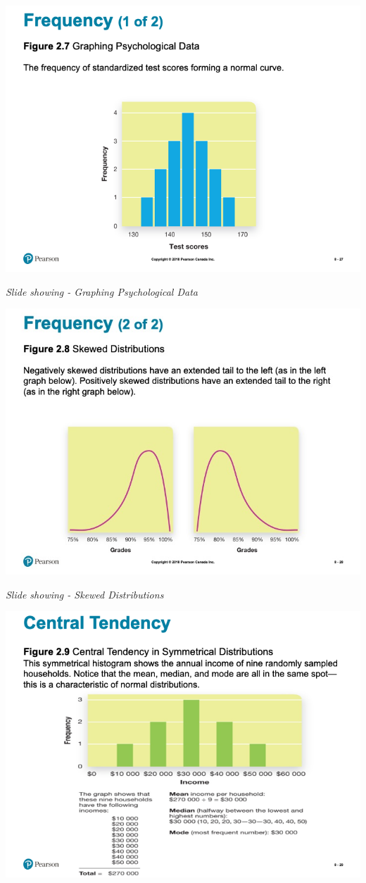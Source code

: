 \documentclass[
]{book}
\begin{document}
\includegraphics{assets/unit_1/slide_27.png}

\emph{Slide showing - Graphing Psychological Data}

\includegraphics{assets/unit_1/slide_28.jpg}

\emph{Slide showing - Skewed Distributions}

\includegraphics{assets/unit_1/slide_29.png}
\end{document}
